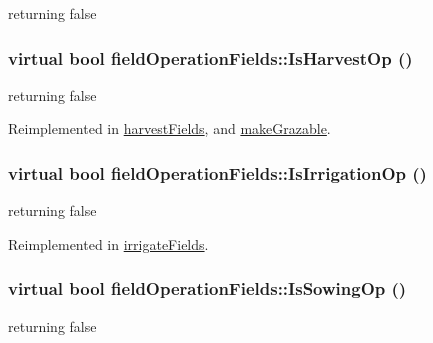returning false \hypertarget{classfield_operation_fields_ad9bda8d7d67001b38bc34e82fa344fca}{
\subsubsection[{IsHarvestOp}]{\setlength{\rightskip}{0pt plus 5cm}virtual bool fieldOperationFields::IsHarvestOp ()}}
\label{classfield_operation_fields_ad9bda8d7d67001b38bc34e82fa344fca}


returning false 

Reimplemented in \hyperlink{classharvest_fields_ab50f128112be82518c06028ecb470cb7}{harvestFields}, and \hyperlink{classmake_grazable_a0c637b243ff0bc8232d121553f417573}{makeGrazable}.\hypertarget{classfield_operation_fields_acc173f03d2190f694c9bef2fd1e5a314}{
\subsubsection[{IsIrrigationOp}]{\setlength{\rightskip}{0pt plus 5cm}virtual bool fieldOperationFields::IsIrrigationOp ()}}
\label{classfield_operation_fields_acc173f03d2190f694c9bef2fd1e5a314}


returning false 

Reimplemented in \hyperlink{classirrigate_fields_a5ec3ea58a4f844b81c394155e332829c}{irrigateFields}.\hypertarget{classfield_operation_fields_a223d85319e913d2337715db404a47c4f}{
\subsubsection[{IsSowingOp}]{\setlength{\rightskip}{0pt plus 5cm}virtual bool fieldOperationFields::IsSowingOp ()}}
\label{classfield_operation_fields_a223d85319e913d2337715db404a47c4f}


returning false 

